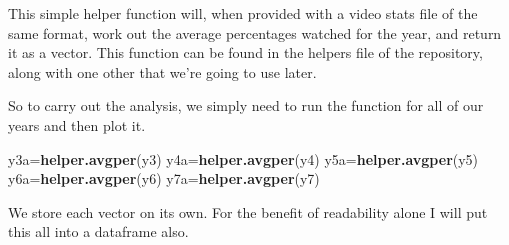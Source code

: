 \documentclass[
]{article}
\newenvironment{Shaded}{\begin{snugshade}}{\end{snugshade}}
\newcommand{\KeywordTok}[1]{\textcolor[rgb]{0.13,0.29,0.53}{\textbf{#1}}}
\newcommand{\NormalTok}[1]{#1}
\begin{document}
This simple helper function will, when provided with a video stats file
of the same format, work out the average percentages watched for the
year, and return it as a vector. This function can be found in the
helpers file of the repository, along with one other that we're going to
use later.

So to carry out the analysis, we simply need to run the function for all
of our years and then plot it.

\begin{Shaded}
\begin{Highlighting}[]
\NormalTok{y3a=}\KeywordTok{helper.avgper}\NormalTok{(y3)}
\NormalTok{y4a=}\KeywordTok{helper.avgper}\NormalTok{(y4)}
\NormalTok{y5a=}\KeywordTok{helper.avgper}\NormalTok{(y5)}
\NormalTok{y6a=}\KeywordTok{helper.avgper}\NormalTok{(y6)}
\NormalTok{y7a=}\KeywordTok{helper.avgper}\NormalTok{(y7)}
\end{Highlighting}
\end{Shaded}

We store each vector on its own. For the benefit of readability alone I
will put this all into a dataframe also.
\end{document}
